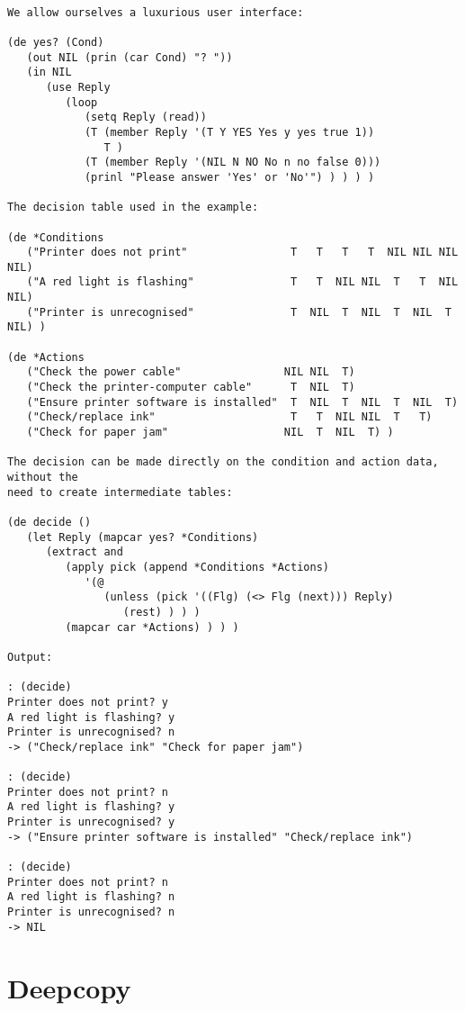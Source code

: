 \begin{verbatim}

We allow ourselves a luxurious user interface:

(de yes? (Cond)
   (out NIL (prin (car Cond) "? "))
   (in NIL
      (use Reply
         (loop
            (setq Reply (read))
            (T (member Reply '(T Y YES Yes y yes true 1))
               T )
            (T (member Reply '(NIL N NO No n no false 0)))
            (prinl "Please answer 'Yes' or 'No'") ) ) ) )

The decision table used in the example:

(de *Conditions
   ("Printer does not print"                T   T   T   T  NIL NIL NIL NIL)
   ("A red light is flashing"               T   T  NIL NIL  T   T  NIL NIL)
   ("Printer is unrecognised"               T  NIL  T  NIL  T  NIL  T  NIL) )

(de *Actions
   ("Check the power cable"                NIL NIL  T)
   ("Check the printer-computer cable"      T  NIL  T)
   ("Ensure printer software is installed"  T  NIL  T  NIL  T  NIL  T)
   ("Check/replace ink"                     T   T  NIL NIL  T   T)
   ("Check for paper jam"                  NIL  T  NIL  T) )

The decision can be made directly on the condition and action data, without the
need to create intermediate tables:

(de decide ()
   (let Reply (mapcar yes? *Conditions)
      (extract and
         (apply pick (append *Conditions *Actions)
            '(@
               (unless (pick '((Flg) (<> Flg (next))) Reply)
                  (rest) ) ) )
         (mapcar car *Actions) ) ) )

Output:

: (decide)
Printer does not print? y
A red light is flashing? y
Printer is unrecognised? n
-> ("Check/replace ink" "Check for paper jam")

: (decide)
Printer does not print? n
A red light is flashing? y
Printer is unrecognised? y
-> ("Ensure printer software is installed" "Check/replace ink")

: (decide)
Printer does not print? n
A red light is flashing? n
Printer is unrecognised? n
-> NIL

\end{verbatim}

\section*{Deepcopy}

